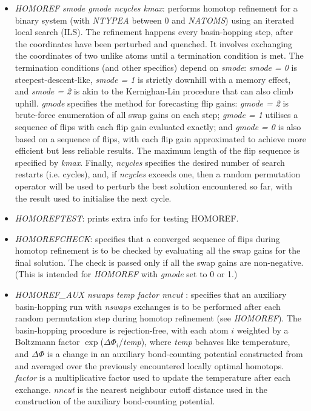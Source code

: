 \documentclass[12pt,a4paper,dvips]{article}
\begin{document}
\begin{itemize}
\item{\it HOMOREF smode gmode ncycles kmax\/}: performs homotop refinement for a binary system (with {\it NTYPEA\/} between 0 and {\it NATOMS\/}) using an iterated local search (ILS). The refinement happens every basin-hopping step, after the coordinates have been perturbed and quenched. It involves exchanging the coordinates of two unlike atoms until a termination condition is met. The termination conditions (and other specifics) depend on {\it smode\/}: {\it smode = 0\/} is steepest-descent-like, {\it smode = 1\/} is strictly downhill with a memory effect, and {\it smode = 2\/} is akin to the Kernighan-Lin procedure that can also climb uphill. {\it gmode\/} specifies the method for forecasting flip gains: {\it gmode = 2 \/} is brute-force enumeration of all swap gains on each step; {\it gmode = 1 \/} utilises a sequence of flips with each flip gain evaluated exactly; and {\it gmode = 0\/} is also based on a sequence of flips, with each flip gain approximated to achieve more efficient but less reliable results. The maximum length of the flip sequence is specified by {\it kmax}. Finally, {\it ncycles\/} specifies the desired number of search restarts (i.e. cycles), and, if {\it ncycles\/} exceeds one, then a random permutation operator will be used to perturb the best solution encountered so far, with the result used to initialise the next cycle.

\item{\it HOMOREFTEST\/}: prints extra info for testing HOMOREF.

\item{\it HOMOREFCHECK\/}: specifies that a converged sequence of flips during homotop refinement is to be checked by evaluating all the swap gains for the final solution. The check is passed only if all the swap gains are non-negative. (This is intended for {\it HOMOREF} with {\it gmode} set to 0 or 1.)

\item{\it HOMOREF\_AUX nswaps temp factor nncut \/}: specifies that an auxiliary basin-hopping run with {\it nswaps\/} exchanges is to be performed after each random permutation step during homotop refinement (see {\it HOMOREF\/}). The basin-hopping procedure is rejection-free, with each atom $i$ weighted by a Boltzmann factor $\exp$($\Delta\Phi_{i}$/{\it temp\/}), where {\it temp} behaves like temperature, and $\Delta \Phi$ is a change in an auxiliary bond-counting potential constructed from and averaged over the previously encountered locally optimal homotops. {\it factor \/} is a multiplicative factor used to update the temperature after each exchange. {\it nncut \/} is the nearest neighbour cutoff distance used in the construction of the auxiliary bond-counting potential.    


\end{itemize}
\end{document}
